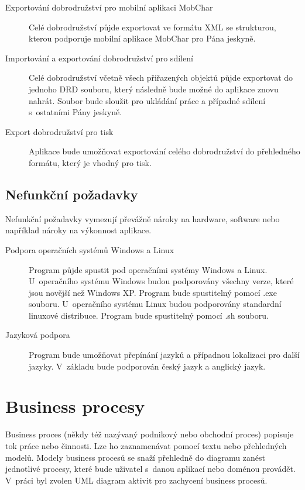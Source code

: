 \documentclass[thesis=B,czech]{resources/FITthesis}[2012/06/26]
\begin{document}
\begin{description}
\item[Exportování dobrodružství pro mobilní aplikaci MobChar] Celé dobrodružství půjde exportovat ve formátu XML se strukturou, kterou podporuje mobilní aplikace MobChar pro Pána jeskyně.

\item[Importování a exportování dobrodružství pro sdílení] Celé dobrodružství včetně všech přiřazených objektů půjde exportovat do jednoho DRD souboru, který následně bude možné do aplikace znovu nahrát. Soubor bude sloužit pro ukládání práce a případné sdílení s~ostatními Pány jeskyně.

\item[Export dobrodružství pro tisk] Aplikace bude umožňovat exportování celého dobrodružství do přehledného formátu, který je vhodný pro tisk. 
\end{description}

\subsection{Nefunkční požadavky}\label{sec:nefunkcni_pozadavky}
Nefunkční požadavky vymezují převážně nároky na hardware, software nebo například nároky na výkonnost aplikace. 
\begin{description}
\item[Podpora operačních systémů Windows a Linux] Program půjde spustit pod operačními systémy Windows a Linux. U~operačního systému Windows budou podporovány všechny verze, které jsou novější než Windows XP. Program bude spustitelný pomocí .exe souboru. U~operačního systému Linux budou podporovány standardní linuxové distribuce. Program bude spustitelný pomocí .sh souboru.

\item[Jazyková podpora] Program bude umožňovat přepínání jazyků a případnou lokalizaci pro další jazyky. V~základu bude podporován český jazyk a anglický jazyk.
\end{description}
	\section{Business procesy}
Business proces (někdy též nazývaný podnikový nebo obchodní proces) popisuje tok práce nebo činnosti. Lze ho zaznamenávat pomocí textu nebo přehledných modelů. Modely business procesů se snaží přehledně do diagramu zanést jednotlivé procesy, které bude uživatel s~danou aplikací nebo doménou provádět. V~práci byl zvolen UML diagram aktivit pro zachycení business procesů.
\end{document}
